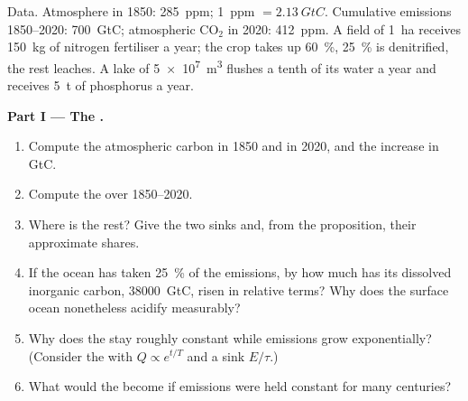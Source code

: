 \begin{problem}
\label{pb:b2:biogeochemical-cycles:1}
Data. Atmosphere in 1850: \qty{285}{ppm}; \qty{1}{ppm} $=
\qty{2.13}{GtC}$. Cumulative emissions 1850--2020: \qty{700}{GtC};
atmospheric $\mathrm{CO_2}$ in 2020: \qty{412}{ppm}. A field of
\qty{1}{ha} receives \qty{150}{kg} of nitrogen fertiliser a year;
the crop takes up \qty{60}{\%}, \qty{25}{\%} is denitrified, the
rest leaches. A lake of \qty{5e7}{m^3} flushes a tenth of its water
a year and receives \qty{5}{t} of phosphorus a year.

\medskip
\noindent\textbf{Part I --- The .}
\begin{enumerate}
  \item Compute the atmospheric carbon in 1850 and in 2020, and the
        increase in GtC.
  \item Compute the  over 1850--2020.
  \item Where is the rest? Give the two sinks and, from the
        proposition, their approximate shares.
  \item If the ocean has taken \qty{25}{\%} of the emissions, by how
        much has its dissolved inorganic carbon, \qty{38000}{GtC},
        risen in relative terms? Why does the surface ocean
        nonetheless acidify measurably?
  \item Why does the  stay roughly constant while
        emissions grow exponentially? (Consider the  with
        $Q \propto e^{t/T}$ and a sink $E/\tau$.)
  \item What would the  become if emissions were
        held constant for many centuries?
\end{enumerate}


\end{problem}
